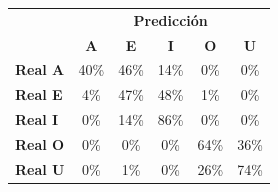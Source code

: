 \begin{tabular}{lccccc}
\toprule
 & \multicolumn{5}{c}{\textbf{Predicción}} \\
 & \textbf{A} & \textbf{E} & \textbf{I} & \textbf{O} & \textbf{U} \\
\midrule
\textbf{Real A} & \cellcolor[rgb]{0.72,0.72,1.00}  40\% & \cellcolor[rgb]{0.68,0.68,1.00}  46\% & \cellcolor[rgb]{0.90,0.90,1.00}  14\% & \cellcolor[rgb]{1.00,1.00,1.00}  0\% & \cellcolor[rgb]{1.00,1.00,1.00}  0\% \\
\textbf{Real E} & \cellcolor[rgb]{0.97,0.97,1.00}  4\% & \cellcolor[rgb]{0.67,0.67,1.00}  47\% & \cellcolor[rgb]{0.67,0.67,1.00}  48\% & \cellcolor[rgb]{0.99,0.99,1.00}  1\% & \cellcolor[rgb]{1.00,1.00,1.00}  0\% \\
\textbf{Real I} & \cellcolor[rgb]{1.00,1.00,1.00}  0\% & \cellcolor[rgb]{0.90,0.90,1.00}  14\% & \cellcolor[rgb]{0.40,0.40,1.00} \color{white} 86\% & \cellcolor[rgb]{1.00,1.00,1.00}  0\% & \cellcolor[rgb]{1.00,1.00,1.00}  0\% \\
\textbf{Real O} & \cellcolor[rgb]{1.00,1.00,1.00}  0\% & \cellcolor[rgb]{1.00,1.00,1.00}  0\% & \cellcolor[rgb]{1.00,1.00,1.00}  0\% & \cellcolor[rgb]{0.55,0.55,1.00} \color{white} 64\% & \cellcolor[rgb]{0.75,0.75,1.00}  36\% \\
\textbf{Real U} & \cellcolor[rgb]{1.00,1.00,1.00}  0\% & \cellcolor[rgb]{1.00,1.00,1.00}  1\% & \cellcolor[rgb]{1.00,1.00,1.00}  0\% & \cellcolor[rgb]{0.82,0.82,1.00}  26\% & \cellcolor[rgb]{0.48,0.48,1.00} \color{white} 74\% \\
\bottomrule
\end{tabular}